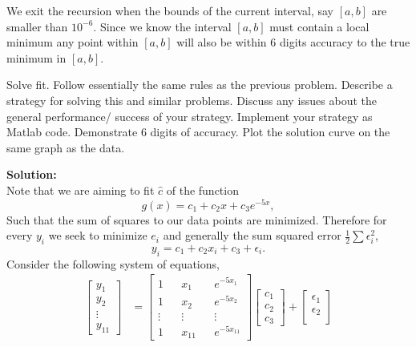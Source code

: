 \documentclass[12pt]{article}
\makeatletter
\theoremstyle{homework}
\newenvironment{exercise}[1]
{\def\@currentlabel{#1}\exercisecore}
{\endexercisecore}
\newcommand{\localhead}[1]{\par\smallskip\noindent\textbf{#1}\nobreak\\}%
\newcommand\solution{\localhead{Solution:}}
\makeatother
\begin{document}
\begin{exercise}{Problem P1}
  We exit the recursion when the bounds of the current interval, say $[a, b]$ are smaller than $10^{-6}$. Since we know the interval $[a,b]$ must contain a local minimum
  any point within $[a,b]$ will also be within 6 digits accuracy to the true minimum in $[a, b]$.
  \vspace{1in}

  \begin{exercise}{Problem P2} Solve fit. Follow essentially the same rules as the previous problem. Describe a strategy for solving 
    this and similar problems. Discuss any issues about the general performance/ success of your strategy. Implement your strategy as Matlab code.
    Demonstrate 6 digits of accuracy. Plot the solution curve on the same graph as the data.\\
    \solution Note that we are aiming to fit $\hat{c}$ of the function 
    \begin{equation*}
      g(x) = c_1 + c_2x + c_3e^{-5x},
    \end{equation*}
    Such that the sum of squares to our data points are minimized. Therefore for every $y_i$ we seek to minimize $e_i$ and generally the sum squared error $\frac{1}{2}\sum \epsilon_i^2$, 
    \begin{equation*}
      y_i = c_1 + c_2x_i + c_3 + \epsilon_i.
    \end{equation*}
    Consider the following system of equations, 
    \begin{align*}
      \begin{bmatrix}
        y_1\\
        y_2\\
        \vdots \\
        y_{11}
      \end{bmatrix}
       &=
       \begin{bmatrix}
        1 && x_1 && e^{-5x_1}\\
        1 && x_2 && e^{-5x_2}\\ 
        \vdots && \vdots && \vdots\\ 
        1 && x_{11} && e^{-5x_{11}}
       \end{bmatrix}
       \begin{bmatrix}
        c_1\\
        c_2\\
        c_3
       \end{bmatrix}
        + 
        \begin{bmatrix}
          \epsilon_1\\
          \epsilon_2\\

\end{bmatrix}
\end{align*}
\end{exercise}
\end{exercise}
\end{document}
